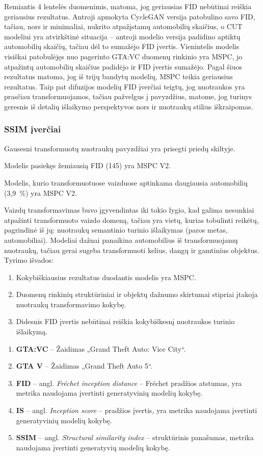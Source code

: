 \documentclass{VUMIFPSbakalaurinis}
\begin{document}
            Remiantis 4 lentelės duomenimis, matoma, jog geriausias FID nebūtinai reiškia geriausius rezultatus. Antroji apmokyta CycleGAN versija patobulino savo FID, tačiau, nors ir minimaliai, nukrito atpažįstamų automobilių skaičius, o CUT modeliui yra atvirkštinė situacija – antroji modelio versija padidino aptiktų automobilių skaičių, tačiau dėl to sumažėjo FID įvertis. Vienintelis modelis visiškai patobulėjęs nuo pagerinto GTA:VC duomenų rinkinio yra MSPC, jo atpažintų automobilių skaičius padidėjo ir FID įvertis sumažėjo. Pagal šiuos rezultatus matoma, jog iš trijų bandytų modelių, MSPC teikia geriausius rezultatus. Taip pat difuzijos modelių FID įverčiai teigtų, jog nuotraukos yra prasčiau transformuojamos, tačiau pažvelgus į pavyzdžius, matome, jog turinys geresnis iš detalių išlaikymo perspektyvos nors ir nuotraukų stilius iškraipomas.
        \subsubsection{SSIM įverčiai}
        
    
Gausesni transformuotų nuotraukų pavyzdžiai yra prisegti priedų skiltyje.

Modelis pasiekęs žemiausią FID (145) yra MSPC V2. 

Modelis, kurio transformuotuose vaizduose aptinkama daugiausia automobilių (3,9~\%) yra MSPC V2.

Vaizdų transformavimas buvo įgyvendintas iki tokio lygio, kad galima nesunkiai atpažinti transformuoto vaizdo domeną, tačiau yra vietų, kurias tobulinti reikėtų, pagrindinė iš jų: nuotraukų semantinio turinio išlaikymas (paros metas, automobiliai). Modeliai dažnai panaikina automobilius iš transformuojamų nuotraukų, tačiau gerai sugeba transformuoti kelius, dangų ir gamtinius objektus.
Tyrimo išvados:
\begin{enumerate}
    \item Kokybiškiausius rezultatus duodantis modelis yra MSPC.
    \item Duomenų rinkinių struktūriniai ir objektų dažnumo skirtumai stipriai įtakoja nuotraukų transformavimo kokybę.
    \item Didesnis FID įvertis nebūtinai reiškia kokybiškesnį nuotraukos turinio išlaikymą.
\end{enumerate}

\begin{enumerate}
    \item \textbf{GTA:VC} – Žaidimas „Grand Theft Auto: Vice City“.
    \item \textbf{GTA V} – Žaidimas „Grand Theft Auto 5“.
    \item \textbf{FID} – angl. \emph{Fréchet inception distance} – Fréchet pradžios atstumas, yra metrika naudojama įvertinti generatyvinių modelių kokybę.
    \item \textbf{IS} – angl. \emph{Inception score} – pradžios įvertis, yra metrika naudojama įvertinti generatyvinių modelių kokybę.
    \item \textbf{SSIM} – angl. \emph{Structural similarity index} – struktūrinis panašumas, metrika naudojama įvertinti generatyvių modelių kokybę.
\end{enumerate}
\end{document}
